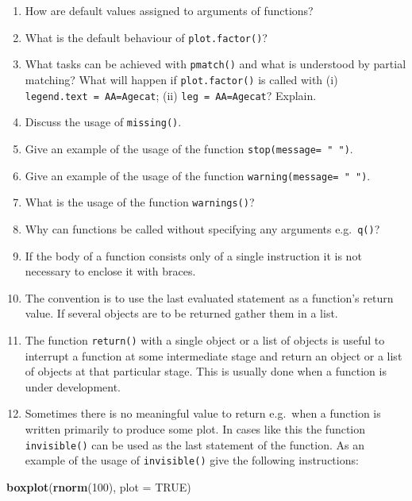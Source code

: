 \documentclass[
]{book}
\newenvironment{Shaded}{\begin{snugshade}}{\end{snugshade}}
\newcommand{\AttributeTok}[1]{\textcolor[rgb]{0.13,0.29,0.53}{#1}}
\newcommand{\ConstantTok}[1]{\textcolor[rgb]{0.56,0.35,0.01}{#1}}
\newcommand{\DecValTok}[1]{\textcolor[rgb]{0.00,0.00,0.81}{#1}}
\newcommand{\FunctionTok}[1]{\textcolor[rgb]{0.13,0.29,0.53}{\textbf{#1}}}
\newcommand{\NormalTok}[1]{#1}
\begin{document}
\begin{enumerate}
\def\labelenumi{(\alph{enumi})}
\item
  How are default values assigned to arguments of functions?
\item
  What is the default behaviour of \texttt{plot.factor()}?
\item
  What tasks can be achieved with \texttt{pmatch()} and what is understood by partial matching? What will happen if \texttt{plot.factor()} is called with (i) \texttt{legend.text\ =\ \textquotesingle{}AA=Agecat\textquotesingle{}}; (ii) \texttt{leg\ =\ \textquotesingle{}AA=Agecat\textquotesingle{}}? Explain.
\item
  Discuss the usage of \texttt{missing()}.
\item
  Give an example of the usage of the function \texttt{stop(message=\ "\ ")}.
\item
  Give an example of the usage of the function \texttt{warning(message=\ "\ ")}.
\item
  What is the usage of the function \texttt{warnings()}?
\item
  Why can functions be called without specifying any arguments e.g.~\texttt{q()}?
\item
  If the body of a function consists only of a single instruction it is not necessary to enclose it with braces.
\item
  The convention is to use the last evaluated statement as a function's return value. If several objects are to be returned gather them in a list.
\item
  The function \texttt{return()} with a single object or a list of objects is useful to interrupt a function at some intermediate stage and return an object or a list of objects at that particular stage. This is usually done when a function is under development.
\item
  Sometimes there is no meaningful value to return e.g.~when a function is written primarily to produce some plot. In cases like this the function \texttt{invisible()} can be used as the last statement of the function. As an example of the usage of \texttt{invisible()} give the following instructions:
\end{enumerate}

\begin{Shaded}
\begin{Highlighting}[]
\FunctionTok{boxplot}\NormalTok{(}\FunctionTok{rnorm}\NormalTok{(}\DecValTok{100}\NormalTok{), }\AttributeTok{plot =} \ConstantTok{TRUE}\NormalTok{)}
\end{Highlighting}
\end{Shaded}
\end{document}
